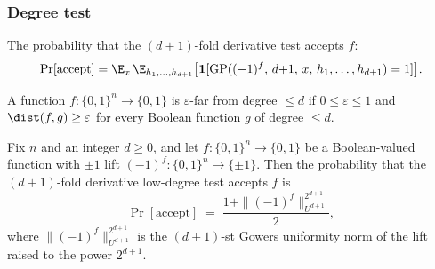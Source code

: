 \subsubsection{Degree test}

\begin{definition}
\label{LowDegreeTest.degree_test_accept_prob}
\leanok
{}
The probability that the $(d{+}1)$-fold derivative test accepts $f$:
\[
  \Pr[\text{accept}] =
  \E_{x}\,\E_{h_1,\ldots,h_{d+1}}
  \bigl[\mathbf{1}[\mathrm{GP}((-1)^f,\, d{+}1,\, x,\, h_1,\ldots,h_{d+1}) = 1]\bigr].
\]
\end{definition}

\begin{definition}
\label{LowDegreeTest.epsilon_far_from_degree}
\leanok
{}
A function $f : \{0,1\}^n \to \{0,1\}$ is $\varepsilon$-far from degree $\le d$
if $0 \le \varepsilon \le 1$ and $\dist(f, g) \ge \varepsilon$ for every Boolean
function $g$ of degree $\le d$.
\end{definition}

\begin{lemma}
\label{LowDegreeTest.degree_test_accept_prob_eq}
\leanok
{}
Fix $n$ and an integer $d \ge 0$, and let $f : \{0,1\}^n \to \{0,1\}$ be a
Boolean-valued function with $\pm1$ lift $(-1)^f : \{0,1\}^n \to \{\pm1\}$. Then the
probability that the $(d+1)$-fold derivative low-degree test accepts $f$ is
\[
  \Pr[\text{accept}] \;=\; \frac{1 + \|(-1)^f\|_{U^{d+1}}^{2^{d+1}}}{2},
\]
where $\|(-1)^f\|_{U^{d+1}}^{2^{d+1}}$ is the $(d+1)$-st Gowers uniformity norm of the
lift raised to the power $2^{d+1}$.
\end{lemma}

